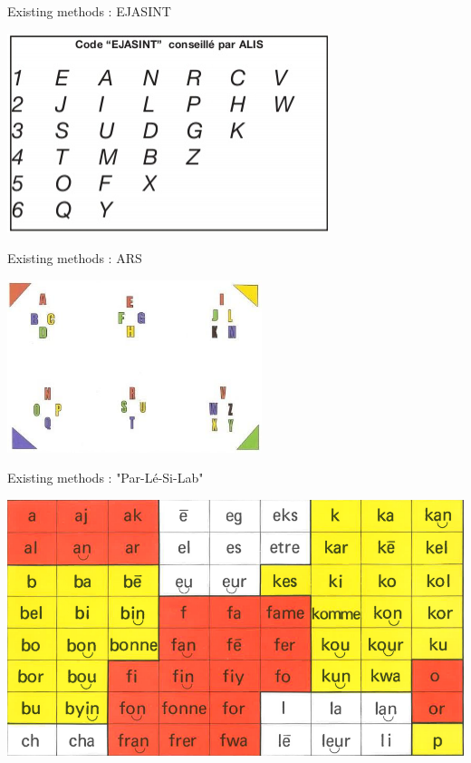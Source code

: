 \documentclass[graphics]{beamer}
\begin{document}
\begin{frame}{Existing methods : EJASINT}
	\begin{center}
		\includegraphics[scale=0.7]{ejasint}
	\end{center}
\end{frame}

\begin{frame}{Existing methods : ARS}
	\begin{center}
		\includegraphics[scale=0.9]{tableau_lettres_transparent}
	\end{center}
\end{frame}

\begin{frame}{Existing methods : "Par-Lé-Si-Lab"}
	\begin{center}
		\includegraphics[scale=0.3]{parler_syllabes}
	\end{center}
\end{frame}
\end{document}
